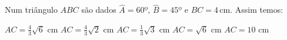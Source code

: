 Num tri\^angulo $ABC$ s\~ao dados $\hat{A}=60º$, $\hat{B}=45º$ e $BC=4$\,cm. Assim temos:

$AC=\frac{4}{3}\sqrt{6}$ cm
$AC=\frac{4}{3}\sqrt{2}$ cm
$AC=\frac{1}{3}\sqrt{3}$ cm
$AC=\sqrt{6}$ cm
$AC=10$ cm




